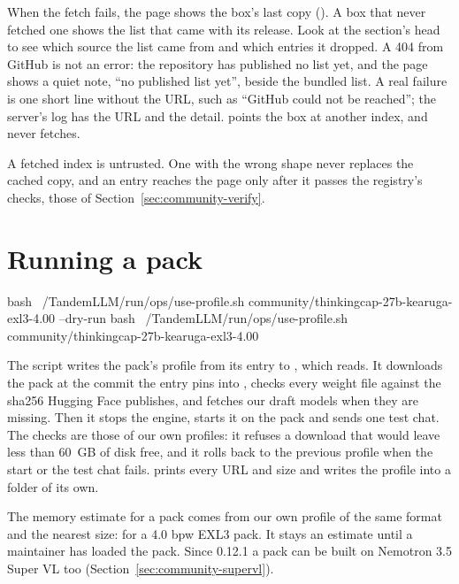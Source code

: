 When the fetch fails, the page shows the box's last copy (). A box that never fetched one shows the list that came with its release. Look at the section's head to see which source the list came from and which entries it dropped. A 404 from GitHub is not an error: the repository has published no list yet, and the page shows a quiet note, \enquote{no published list yet}, beside the bundled list. A real failure is one short line without the URL, such as \enquote{GitHub could not be reached}; the server's log has the URL and the detail.  points the box at another index, and  never fetches.

A fetched index is untrusted. One with the wrong shape never replaces the cached copy, and an entry reaches the page only after it passes the registry's checks, those of Section~\ref{sec:community-verify}.

\section{Running a pack}\label{sec:community-run}

\begin{shell}
bash ~/TandemLLM/run/ops/use-profile.sh community/thinkingcap-27b-kearuga-exl3-4.00 --dry-run
bash ~/TandemLLM/run/ops/use-profile.sh community/thinkingcap-27b-kearuga-exl3-4.00
\end{shell}

The script writes the pack's profile from its entry to , which  reads. It downloads the pack at the commit the entry pins into , checks every weight file against the sha256 Hugging Face publishes, and fetches our draft models when they are missing. Then it stops the engine, starts it on the pack and sends one test chat. The checks are those of our own profiles: it refuses a download that would leave less than 60~GB of disk free, and it rolls back to the previous profile when the start or the test chat fails.  prints every URL and size and writes the profile into a folder of its own.

The memory estimate for a pack comes from our own profile of the same format and the nearest size:  for a 4.0 bpw EXL3 pack. It stays an estimate until a maintainer has loaded the pack. Since 0.12.1 a pack can be built on Nemotron 3.5 Super VL too (Section~\ref{sec:community-supervl}).

